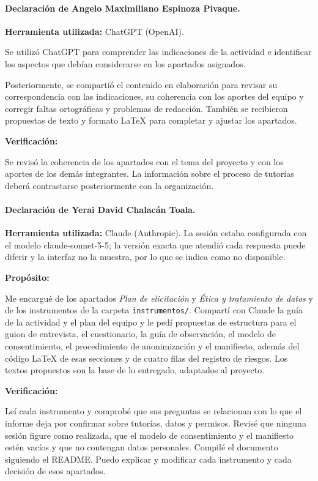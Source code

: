 \documentclass[11pt,a4paper]{article}
\begin{document}
\paragraph{Declaración de Angelo Maximiliano Espinoza Pivaque.}

\textbf{Herramienta utilizada:} ChatGPT (OpenAI).

Se utilizó ChatGPT para comprender las indicaciones
de la actividad e identificar los aspectos que debían
considerarse en los apartados asignados.

Posteriormente, se compartió el contenido en elaboración
para revisar su correspondencia con las indicaciones,
su coherencia con los aportes del equipo y corregir
faltas ortográficas y problemas de redacción.
También se recibieron propuestas de texto y formato
LaTeX para completar y ajustar los apartados.

\textbf{Verificación:}

Se revisó la coherencia de los apartados con el tema
del proyecto y con los aportes de los demás integrantes.
La información sobre el proceso de tutorías deberá
contrastarse posteriormente con la organización.

\paragraph{Declaración de Yerai David Chalacán Toala.}

\textbf{Herramienta utilizada:} Claude (Anthropic). La sesión estaba configurada con el modelo claude-sonnet-5-5; la versión exacta que atendió cada respuesta puede diferir y la interfaz no la muestra, por lo que se indica como no disponible.

\textbf{Propósito:}

Me encargué de los apartados \textit{Plan de elicitación} y \textit{Ética y tratamiento de datos} y de los instrumentos de la carpeta \texttt{instrumentos/}. Compartí con Claude la guía de la actividad y el plan del equipo y le pedí propuestas de estructura para el guion de entrevista, el cuestionario, la guía de observación, el modelo de consentimiento, el procedimiento de anonimización y el manifiesto, además del código \LaTeX{} de esas secciones y de cuatro filas del registro de riesgos. Los textos propuestos son la base de lo entregado, adaptados al proyecto.

\textbf{Verificación:}

Leí cada instrumento y comprobé que sus preguntas se relacionan con lo que el informe deja por confirmar sobre tutorías, datos y permisos. Revisé que ninguna sesión figure como realizada, que el modelo de consentimiento y el manifiesto estén vacíos y que no contengan datos personales. Compilé el documento siguiendo el README. Puedo explicar y modificar cada instrumento y cada decisión de esos apartados.
\end{document}
